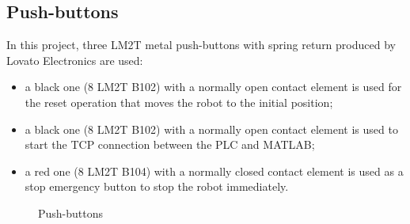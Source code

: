 \subsection{Push-buttons}
In this project, three LM2T metal push-buttons with spring return produced by Lovato Electronics are used:
\begin{itemize}
    \item a black one (8 LM2T B102) with a normally open contact element is used for the reset operation that moves the robot to the initial position;
    \item a black one (8 LM2T B102) with a normally open contact element is used to start the TCP connection between the PLC and MATLAB;
    \item a red one (8 LM2T B104) with a normally closed contact element is used as a stop emergency button to stop the robot immediately.
\end{itemize}
\begin{figure}[!h]
\centering
{}
\qquad
{}
\qquad
{}
\caption{Push-buttons}
\label{fig:pushbuttons}
\end{figure}

